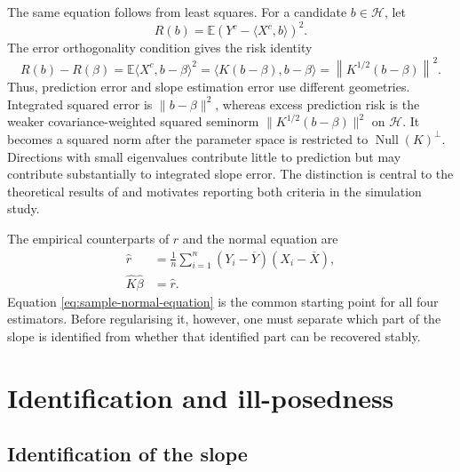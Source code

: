 The same equation follows from least squares. For a candidate $b\in\mathcal H$, let
\begin{equation}
    R(b)=\mathbb E\left(Y^c-\langle X^c,b\rangle\right)^2.
    \label{eq:population-risk}
\end{equation}
The error orthogonality condition gives the risk identity
\begin{equation}
    R(b)-R(\beta)
    =\mathbb E\langle X^c,b-\beta\rangle^2
    =\langle K(b-\beta),b-\beta\rangle
    =\left\|K^{1/2}(b-\beta)\right\|^2.
    \label{eq:prediction-risk-identity}
\end{equation}
Thus, prediction error and slope estimation error use different geometries. Integrated squared error is $\|b-\beta\|^2$, whereas excess prediction risk is the weaker covariance-weighted squared seminorm $\|K^{1/2}(b-\beta)\|^2$ on $\mathcal H$. It becomes a squared norm after the parameter space is restricted to $\operatorname{Null}(K)^\perp$. Directions with small eigenvalues contribute little to prediction but may contribute substantially to integrated slope error. The distinction is central to the theoretical results of \textcite{cai_hall_2006} and motivates reporting both criteria in the simulation study.

The empirical counterparts of $r$ and the normal equation are
\begin{align}
    \widehat r
    &=\frac1n\sum_{i=1}^{n}(Y_i-\overline Y)(X_i-\overline X),
    \label{eq:sample-cross-covariance}\\
    \widehat K\widehat\beta
    &=\widehat r.
    \label{eq:sample-normal-equation}
\end{align}
Equation \eqref{eq:sample-normal-equation} is the common starting point for all four estimators. Before regularising it, however, one must separate which part of the slope is identified from whether that identified part can be recovered stably.

\section{Identification and ill-posedness}
\label{sec:identification-illposedness}

\subsection{Identification of the slope}

